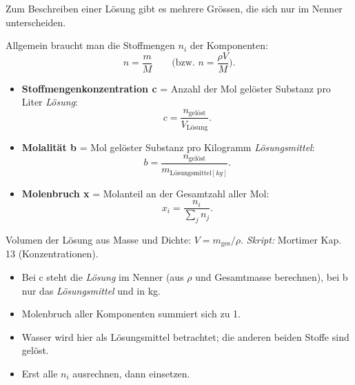 

Zum Beschreiben einer Lösung gibt es mehrere Grössen, die sich nur im
Nenner unterscheiden.

\begin{werkzeugkasten}[Konzentrationsmasse]
Allgemein braucht man die Stoffmengen $n_i$ der Komponenten:
\[
  n = \frac{m}{M}\qquad\text{(bzw. } n=\frac{\rho V}{M}\text{)}.
\]
\begin{itemize}
  \item \textbf{Stoffmengenkonzentration c} = Anzahl der Mol gelöster
        Substanz pro Liter \emph{Lösung}:
        \[
          c = \frac{n_{\text{gelöst}}}{V_{\text{Lösung}}}.
        \]
  \item \textbf{Molalität b} = Mol gelöster Substanz pro Kilogramm
        \emph{Lösungsmittel}:
        \[
          b = \frac{n_{\text{gelöst}}}{m_{\text{Lösungsmittel}[kg]}}.
        \]
  \item \textbf{Molenbruch x} = Molanteil an der Gesamtzahl aller Mol:
        \[
          x_i = \frac{n_i}{\sum_j n_j}.
        \]
\end{itemize}
Volumen der Lösung aus Masse und Dichte: $V = m_{\text{ges}}/\rho$.
\textit{Skript:} Mortimer Kap. 13 (Konzentrationen).
\end{werkzeugkasten}

\begin{achtung}
\begin{itemize}
  \item Bei c steht die \emph{Lösung} im Nenner (aus $\rho$ und Gesamtmasse
        berechnen), bei b nur das \emph{Lösungsmittel} und in kg.
  \item Molenbruch aller Komponenten summiert sich zu 1.
  \item Wasser wird hier als Lösungsmittel betrachtet; die anderen beiden
        Stoffe sind gelöst.
  \item Erst alle $n_i$ ausrechnen, dann einsetzen.
\end{itemize}
\end{achtung}
